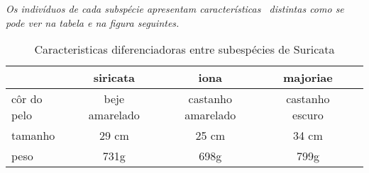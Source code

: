 \documentclass[a4paper,11pt]{report}
\begin{document}
	\textit{Os indivíduos de cada subspécie apresentam características \
	distintas como se pode ver na tabela e na figura seguintes.}


	\begin{table}[]
	\caption{Caracteristicas diferenciadoras entre subespécies de Suricata}

	\begin{tabular}{|l || c | c | c |c|} \hline
		& siricata & iona & majoriae \\ \hline
		côr do pelo & beje amarelado & castanho amarelado  & castanho escuro \\ \hline
		tamanho & 29 cm & 25 cm & 34 cm \\ \hline
		peso & 731g & 698g  & 799g \\ \hline
	\end{tabular}
	\end {table}
\end{document}
